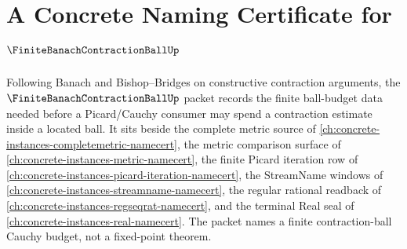 \chapter{A Concrete Naming Certificate for $\FiniteBanachContractionBallUp$}
\label{ch:concrete-instances-finite-banach-contraction-ball-namecert}

Following Banach and Bishop--Bridges on constructive contraction arguments, the $\FiniteBanachContractionBallUp$ packet records the finite ball-budget data needed before a Picard/Cauchy consumer may spend a contraction estimate inside a located ball. It sits beside the complete metric source of \autoref{ch:concrete-instances-completemetric-namecert}, the metric comparison surface of \autoref{ch:concrete-instances-metric-namecert}, the finite Picard iteration row of \autoref{ch:concrete-instances-picard-iteration-namecert}, the StreamName windows of \autoref{ch:concrete-instances-streamname-namecert}, the regular rational readback of \autoref{ch:concrete-instances-regseqrat-namecert}, and the terminal Real seal of \autoref{ch:concrete-instances-real-namecert}. The packet names a finite contraction-ball Cauchy budget, not a fixed-point theorem.

